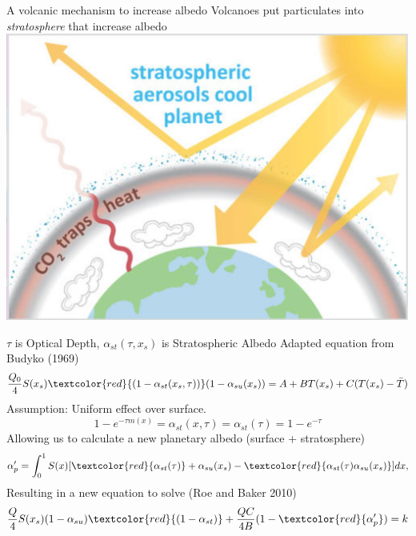 \documentclass[11pt,handout]{beamer}
\begin{document}
\begin{frame}{A volcanic mechanism to increase albedo}
    Volcanoes put particulates into \emph{stratosphere} that increase albedo
    \centering
    \includegraphics[width=.9\textwidth,height=.9\textheight,keepaspectratio]{img/strat_aerosol_diagram.jpg}
\end{frame}

\begin{frame}{$\tau$ is Optical Depth, $\alpha_{st}(\tau, x_s)$ is Stratospheric Albedo}
    Adapted equation from Budyko (1969)
    $$\frac{Q_0}{4} S(x_s)\textcolor{red}{(1-\alpha_{st}(x_s, \tau))}(1-\alpha_{su}(x_s)) = A + BT(x_s) + C (T(x_s)-\bar{T})$$
    \pause
    Assumption: Uniform effect over surface.
    $$1- e^{-\tau m(x)} = \alpha_{st}(x, \tau) = \alpha_{st}(\tau) = 1- e^{-\tau}$$
    \pause
    Allowing us to calculate a new planetary albedo (surface + stratosphere)
    $$ \alpha_p' = \int_0^1 S(x) [\textcolor{red}{\alpha_{st}(\tau)} + \alpha_{su}(x_s) - \textcolor{red}{\alpha_{st}(\tau)\alpha_{su}(x_s)}] dx,$$
    \pause
    Resulting in a new equation to solve (Roe and Baker 2010)
    $$\frac{Q}{4}S(x_s)(1-\alpha_{su})\textcolor{red}{(1-\alpha_{st})} + \frac{QC}{4B}(1-\textcolor{red}{\alpha_p'}) = k$$
\end{frame}
\end{document}
